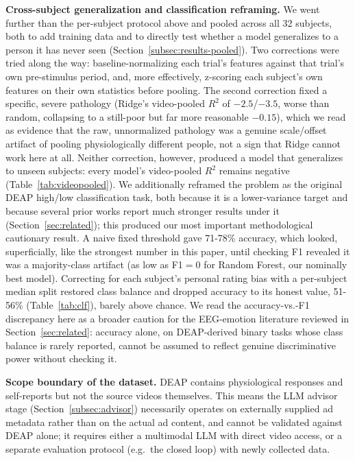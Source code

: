 \documentclass[conference]{IEEEtran}
\begin{document}
\textbf{Cross-subject generalization and classification reframing.} We
went further than the per-subject protocol above and pooled across all 32
subjects, both to add training data and to directly test whether a model
generalizes to a person it has never seen (Section~\ref{subsec:results-pooled}).
Two corrections were tried along the way: baseline-normalizing each
trial's features against that trial's own pre-stimulus period, and, more
effectively, z-scoring each subject's own features on their own
statistics before pooling. The second correction fixed a specific,
severe pathology (Ridge's video-pooled $R^2$ of $-2.5$/$-3.5$, worse than
random, collapsing to a still-poor but far more reasonable $-0.15$), which
we read as evidence that the raw, unnormalized pathology was a genuine
scale/offset artifact of pooling physiologically different people, not a
sign that Ridge cannot work here at all. Neither correction, however,
produced a model that generalizes to unseen subjects: every model's
video-pooled $R^2$ remains negative (Table~\ref{tab:videopooled}). We
additionally reframed the problem as the original DEAP high/low
classification task, both because it is a lower-variance target and
because several prior works report much stronger results under it
(Section~\ref{sec:related}); this produced our most important
methodological cautionary result. A naive fixed threshold gave 71-78\%
accuracy, which looked, superficially, like the strongest number in this
paper, until checking F1 revealed it was a majority-class artifact (as
low as F1$=0$ for Random Forest, our nominally best model). Correcting
for each subject's personal rating bias with a per-subject median split
restored class balance and dropped accuracy to its honest value, 51-56\%
(Table~\ref{tab:clf}), barely above chance. We read the accuracy-vs.-F1
discrepancy here as a broader caution for the EEG-emotion literature
reviewed in Section~\ref{sec:related}: accuracy alone, on DEAP-derived
binary tasks whose class balance is rarely reported, cannot be assumed to
reflect genuine discriminative power without checking it.

\textbf{Scope boundary of the dataset.} DEAP contains physiological
responses and self-reports but not the source videos themselves. This
means the LLM advisor stage (Section~\ref{subsec:advisor}) necessarily
operates on externally supplied ad metadata rather than on the actual ad
content, and cannot be validated against DEAP alone; it requires either
a multimodal LLM with direct video access, or a separate evaluation
protocol (e.g.\ the closed loop) with newly collected data.
\end{document}

